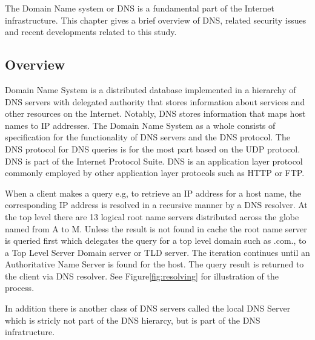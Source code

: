 The Domain Name system or DNS \cite{RFC1035}\cite{RFC1034} is a fundamental part of the Internet infrastructure. This chapter gives a brief overview of DNS, related security issues and recent developments related to this study.

\subsection{Overview}
Domain Name System is a distributed database implemented in a hierarchy of DNS servers with delegated authority that stores information about services and other resources on the Internet. Notably, DNS stores information that maps host names to IP addresses. The Domain Name System as a whole consists of specification for the functionality of DNS servers and the DNS protocol. The DNS protocol for DNS queries is for the most part based on the UDP protocol. DNS is part of the Internet Protocol Suite. DNS is an application layer protocol commonly employed by other application layer protocols such as HTTP or FTP. \citep{kurose_ross}\cite{tanenbaum} 

When a client makes a query e.g, to retrieve an IP address for a host name, the corresponding IP address is resolved in a recursive manner by a DNS resolver. At the top level there are 13 logical root name servers distributed across the globe named from A to M. Unless the result is not found in cache the root name server is queried first which delegates the query for a top level domain such as .com., to a Top Level Server Domain server or TLD server. The iteration continues until an Authoritative Name Server is found for the host. The query result is returned to the client via DNS resolver. See Figure\ref{fig:resolving} for illustration of the process. \citep{kurose_ross} \cite{tanenbaum} 

In addition there is another class of DNS servers called the local DNS Server which is stricly not part of the DNS hierarcy, but is part of the DNS infratructure. \citep{kurose_ross}


